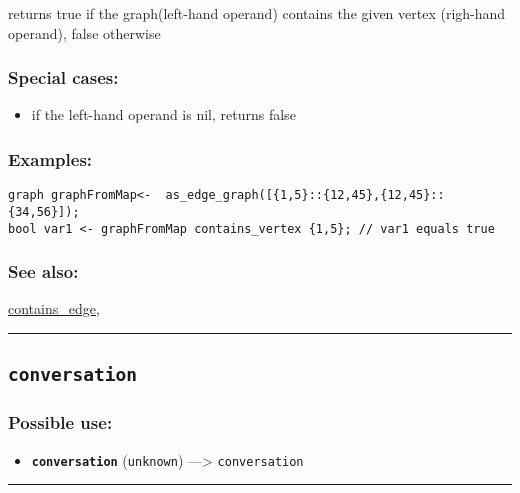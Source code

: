 \documentclass[]{book}
\providecommand{\tightlist}{%
  \setlength{\itemsep}{0pt}\setlength{\parskip}{0pt}}
\theoremstyle{definition}
\theoremstyle{definition}
\theoremstyle{definition}
\theoremstyle{remark}
\begin{document}
returns true if the graph(left-hand operand) contains the given vertex
(righ-hand operand), false otherwise

\subsubsection{Special cases:}\label{special-cases-36}

\begin{itemize}
\tightlist
\item
  if the left-hand operand is nil, returns false
\end{itemize}

\subsubsection{Examples:}\label{examples-80}

\begin{verbatim}
graph graphFromMap<-  as_edge_graph([{1,5}::{12,45},{12,45}::{34,56}]);  
bool var1 <- graphFromMap contains_vertex {1,5}; // var1 equals true
\end{verbatim}

\subsubsection{See also:}\label{see-also-66}

\href{operators-b-to-c.html\#contains_edge}{contains\_edge},

\begin{center}\rule{0.5\linewidth}{\linethickness}\end{center}

\subsection{\texorpdfstring{\texttt{conversation}}{conversation}}\label{conversation}

\subsubsection{Possible use:}\label{possible-use-104}

\begin{itemize}
\tightlist
\item
  \textbf{\texttt{conversation}} (\texttt{unknown}) ---\textgreater{}
  \texttt{conversation}
\end{itemize}

\begin{center}\rule{0.5\linewidth}{\linethickness}\end{center}
\end{document}
